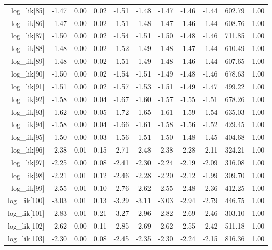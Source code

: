 \begin{table}[ht]
\begin{tabular}{rrrrrrrrrrr}
  log\_lik[85] & -1.47 & 0.00 & 0.02 & -1.51 & -1.48 & -1.47 & -1.46 & -1.44 & 602.79 & 1.00 \\ 
  log\_lik[86] & -1.47 & 0.00 & 0.02 & -1.51 & -1.48 & -1.47 & -1.46 & -1.44 & 608.76 & 1.00 \\ 
  log\_lik[87] & -1.50 & 0.00 & 0.02 & -1.54 & -1.51 & -1.50 & -1.48 & -1.46 & 711.85 & 1.00 \\ 
  log\_lik[88] & -1.48 & 0.00 & 0.02 & -1.52 & -1.49 & -1.48 & -1.47 & -1.44 & 610.49 & 1.00 \\ 
  log\_lik[89] & -1.48 & 0.00 & 0.02 & -1.51 & -1.49 & -1.48 & -1.46 & -1.44 & 607.65 & 1.00 \\ 
  log\_lik[90] & -1.50 & 0.00 & 0.02 & -1.54 & -1.51 & -1.49 & -1.48 & -1.46 & 678.63 & 1.00 \\ 
  log\_lik[91] & -1.51 & 0.00 & 0.02 & -1.57 & -1.53 & -1.51 & -1.49 & -1.47 & 499.22 & 1.00 \\ 
  log\_lik[92] & -1.58 & 0.00 & 0.04 & -1.67 & -1.60 & -1.57 & -1.55 & -1.51 & 678.26 & 1.00 \\ 
  log\_lik[93] & -1.62 & 0.00 & 0.05 & -1.72 & -1.65 & -1.61 & -1.59 & -1.54 & 635.03 & 1.00 \\ 
  log\_lik[94] & -1.58 & 0.00 & 0.04 & -1.66 & -1.61 & -1.58 & -1.56 & -1.52 & 429.45 & 1.00 \\ 
  log\_lik[95] & -1.50 & 0.00 & 0.03 & -1.56 & -1.51 & -1.50 & -1.48 & -1.45 & 404.68 & 1.00 \\ 
  log\_lik[96] & -2.38 & 0.01 & 0.15 & -2.71 & -2.48 & -2.38 & -2.28 & -2.11 & 324.21 & 1.00 \\ 
  log\_lik[97] & -2.25 & 0.00 & 0.08 & -2.41 & -2.30 & -2.24 & -2.19 & -2.09 & 316.08 & 1.00 \\ 
  log\_lik[98] & -2.21 & 0.01 & 0.12 & -2.46 & -2.28 & -2.20 & -2.12 & -1.99 & 309.70 & 1.00 \\ 
  log\_lik[99] & -2.55 & 0.01 & 0.10 & -2.76 & -2.62 & -2.55 & -2.48 & -2.36 & 412.25 & 1.00 \\ 
  log\_lik[100] & -3.03 & 0.01 & 0.13 & -3.29 & -3.11 & -3.03 & -2.94 & -2.79 & 446.75 & 1.00 \\ 
  log\_lik[101] & -2.83 & 0.01 & 0.21 & -3.27 & -2.96 & -2.82 & -2.69 & -2.46 & 303.10 & 1.00 \\ 
  log\_lik[102] & -2.62 & 0.00 & 0.11 & -2.85 & -2.69 & -2.62 & -2.55 & -2.42 & 511.18 & 1.00 \\ 
  log\_lik[103] & -2.30 & 0.00 & 0.08 & -2.45 & -2.35 & -2.30 & -2.24 & -2.15 & 816.36 & 1.00 \\ 

\end{tabular}
\end{table}
